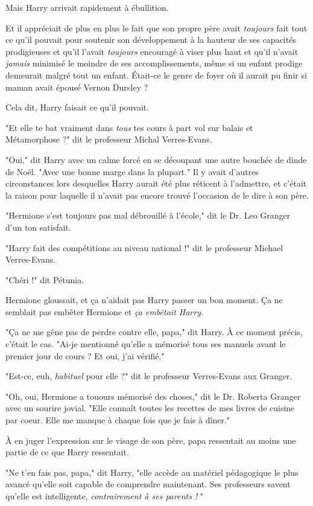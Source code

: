 Mais Harry arrivait rapidement à ébullition.

Et il appréciait de plus en plus le fait que son propre père avait \emph{toujours}  fait tout ce qu'il pouvait pour soutenir son développement à la hauteur de ses capacités prodigieuses et qu'il l'avait \emph{toujours}  encouragé à viser plus haut et qu'il n'avait \emph{jamais}  minimisé le moindre de ses accomplissements, même si un enfant prodige demeurait malgré tout un enfant. Était-ce le genre de foyer où il aurait pu finir si maman avait épousé Vernon Dursley ?

Cela dit, Harry faisait ce qu'il pouvait.

"Et elle te bat vraiment dans \emph{tous}  tes cours à part vol sur balais et Métamorphose ?" dit le professeur Michal Verres-Evans.

"Oui," dit Harry avec un calme forcé en se découpant une autre bouchée de dinde de Noël. "Avec une bonne marge dans la plupart." Il y avait d'autres circonstances lors desquelles Harry aurait été plus réticent à l'admettre, et c'était la raison pour laquelle il n'avait pas encore trouvé l'occasion de le dire à son père.

"Hermione s'est toujours pas mal débrouillé à l'école," dit le Dr. Leo Granger d'un ton satisfait.

"Harry fait des compétitions au niveau national !" dit le professeur Michael Verres-Evans.

"Chéri !" dit Pétunia.

Hermione gloussait, et ça n'aidait pas Harry passer un bon moment. Ça ne semblait pas embêter Hermione et \emph{ça embêtait Harry.} 

"Ça ne me gêne pas de perdre contre elle, papa," dit Harry. À ce moment précis, c'était le cas. "Ai-je mentionné qu'elle a mémorisé tous ses manuels avant le premier jour de cours ? Et oui, j'ai vérifié."

"Est-ce, euh, \emph{habituel}  pour elle ?" dit le professeur Verres-Evans aux Granger.

"Oh, oui, Hermione a touours mémorisé des choses," dit le Dr. Roberta Granger avec un sourire jovial. "Elle connaît toutes les recettes de mes livres de cuisine par coeur. Elle me manque à chaque fois que je fais à dîner."

À en juger l'expression sur le visage de son père, papa ressentait au moins une partie de ce que Harry ressentait.

"Ne t'en fais pas, papa," dit Harry, "elle accède au matériel pédagogique le plus avancé qu'elle soit capable de comprendre maintenant. Ses professeurs savent qu'elle est intelligente, \emph{contrairement à ses parents !} "

